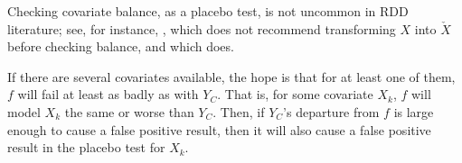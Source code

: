 \documentclass[12pt]{article}
\newcommand{\xch}{\check{X}}
\newcommand{\E}{\mathbb{E}}
\newcommand\independent{\protect\mathpalette{\protect\independenT}{\perp}}
\def\independenT#1#2{\mathrel{\rlap{$#1#2$}\mkern2mu{#1#2}}}
\begin{document}
Checking covariate balance, as a placebo test, is not uncommon in RDD
literature; see, for instance, \citet{rocio}, which does not recommend
transforming $X$ into $\xch$ before checking balance, and
\citet{lee2010regression} which does.

If there are several covariates available, the hope is that for at
least one of them, $f$ will fail at least as badly as with $Y_C$.
That is, for some covariate $X_k$, $f$ will model $X_k$ the same or
worse than $Y_C$.
Then, if $Y_C$'s departure from $f$ is large enough to cause a false
positive result, then it will also cause a false positive result in
the placebo test for $X_k$.


\begin{comment}
Say $Y_{Ci}=\beta_0+\beta_1 R_i+\beta_2 R_i^2 +\epsilon_i$, with
$\E \epsilon_i=0$ and $\epsilon_i \independent R$ for $i\in \mathcal{W}$.
Further, say there exists a covariate $X$ that follows the model
$X=\gamma_0+\gamma_1 R_i +\gamma_2 R_i^2+\zeta_i$.
However, the researcher models $Y_C$ linearly, ignoring the $R^2$
term.
The consequence of this model specification for inference and
estimation depends on the magnitude of $\beta_2$: small $\beta_2$
values may be practically negligible, while large values, in
magnitude, can cause severe problems.
\end{comment}

\end{document}
